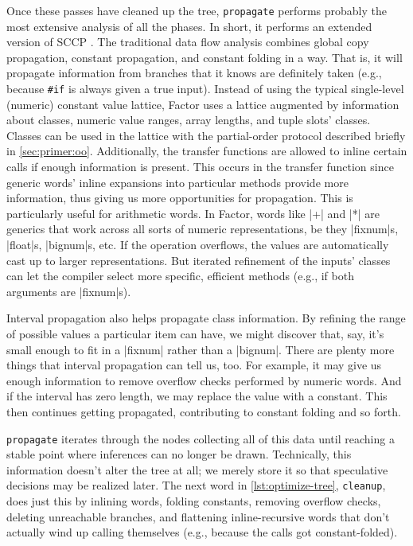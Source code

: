 Once these passes have cleaned up the tree, \Verb|propagate| performs probably
the most extensive analysis of all the phases.  In short, it performs an
extended version of \gls{SCCP} \autocite{SCCP}.  The traditional data flow
analysis combines global copy propagation, constant propagation, and constant
folding in a  way.  That is, it will propagate information
from branches that it knows are definitely taken (e.g., because \Verb|#if| is
always given a true input).  Instead of using the typical single-level
(numeric) constant value lattice, Factor uses a lattice augmented by
information about classes, numeric value ranges, array lengths, and tuple
slots' classes.  Classes can be used in the lattice with the partial-order
protocol described briefly in \cref{sec:primer:oo}.  Additionally, the transfer
functions are allowed to inline certain calls if enough information is present.
This occurs in the transfer function since generic words' inline expansions
into particular methods provide more information, thus giving us more
opportunities for propagation.  This is particularly useful for arithmetic
words.  In Factor, words like \factor|+| and \factor|*| are generics that work
across all sorts of numeric representations, be they \factor|fixnum|s,
\factor|float|s, \factor|bignum|s, etc.  If the operation overflows, the values
are automatically cast up to larger representations.  But iterated refinement
of the inputs' classes can let the compiler select more specific, efficient
methods (e.g., if both arguments are \factor|fixnum|s).

Interval propagation also helps propagate class information.  By refining the
range of possible values a particular item can have, we might discover that,
say, it's small enough to fit in a \factor|fixnum| rather than a
\factor|bignum|.  There are plenty more things that interval propagation can
tell us, too.  For example, it may give us enough information to remove
overflow checks performed by numeric words.  And if the interval has zero
length, we may replace the value with a constant.  This then continues getting
propagated, contributing to constant folding and so forth.

\Verb|propagate| iterates through the nodes collecting all of this data until
reaching a stable point where inferences can no longer be drawn.  Technically,
this information doesn't alter the tree at all; we merely store it so that
speculative decisions may be realized later.  The next word in
\vref{lst:optimize-tree}, \Verb|cleanup|, does just this by inlining words,
folding constants, removing overflow checks, deleting unreachable branches, and
flattening inline-recursive words that don't actually wind up calling
themselves (e.g., because the calls got constant-folded).

